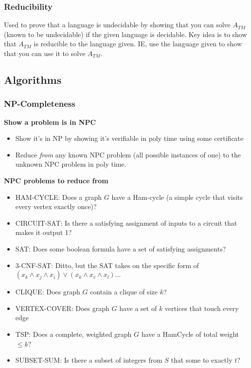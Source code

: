 \documentclass[7pt]{article}
\begin{document}
\begin{multicols*}{4}
\subsubsection*{Reducibility}
Used to prove that a language is undecidable by showing that you can solve $A_{TM}$ (known to be undecidable) if the given language is decidable.  Key idea is to show that $A_{TM}$ is reducible to the language given.  IE, use the language given to show that you can use it to solve $A_{TM}$.

\subsection*{Algorithms}
\subsubsection*{NP-Completeness}
{\bf Show a problem is in NPC}
\begin{itemize}
\item Show it's in NP by showing it's verifiable in poly time using
  some certificate
\item Reduce \emph{from} any known NPC problem (all possible instances
  of one) to the unknown NPC problem in poly time.
\end{itemize}

{\bf NPC problems to reduce from}
\begin{itemize}
\item HAM-CYCLE: Does a graph $G$ have a Ham-cycle (a simple cycle
  that visits every vertex exactly once)?
\item CIRCUIT-SAT: Is there a satisfying assignment of inputs to a
  circuit that makes it output 1?
\item SAT: Does some boolean formula have a set of satisfying assignments?
\item 3-CNF-SAT: Ditto, but the SAT takes on the specific form of
  $(x_k \wedge x_j \wedge x_i) \vee (x_k \wedge x_v \wedge x_l) ...$
\item CLIQUE: Does graph $G$ contain a clique of size $k$?
\item VERTEX-COVER: Does graph $G$ have a set of $k$ vertices that
  touch every edge
\item TSP: Does a complete, weighted graph $G$ have a HamCycle of
  total weight $\leq k$?
\item SUBSET-SUM: Is there a subset of integers from $S$ that some to
  exactly $t$? 
\end{itemize}


\end{multicols*}
\end{document}
